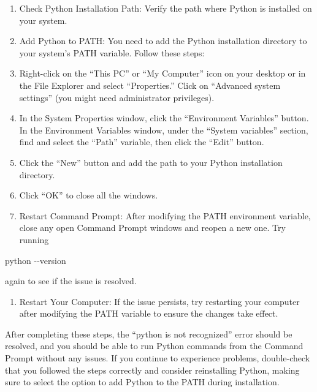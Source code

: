 \documentclass[
]{article}
\newenvironment{Shaded}{\begin{snugshade}}{\end{snugshade}}
\newcommand{\NormalTok}[1]{#1}
\providecommand{\tightlist}{%
  \setlength{\itemsep}{0pt}\setlength{\parskip}{0pt}}
\begin{document}
\begin{enumerate}
\def\labelenumi{\arabic{enumi}.}
\tightlist
\item
  Check Python Installation Path: Verify the path where Python is
  installed on your system.\\
\item
  Add Python to PATH: You need to add the Python installation directory
  to your system's PATH variable. Follow these steps:\\
\item
  Right-click on the ``This PC'' or ``My Computer'' icon on your desktop
  or in the File Explorer and select ``Properties.'' Click on ``Advanced
  system settings'' (you might need administrator privileges).\\
\item
  In the System Properties window, click the ``Environment Variables''
  button. In the Environment Variables window, under the ``System
  variables'' section, find and select the ``Path'' variable, then click
  the ``Edit'' button.\\
\item
  Click the ``New'' button and add the path to your Python installation
  directory.\\
\item
  Click ``OK'' to close all the windows.\\
\item
  Restart Command Prompt: After modifying the PATH environment variable,
  close any open Command Prompt windows and reopen a new one. Try
  running
\end{enumerate}

\begin{Shaded}
\begin{Highlighting}[]
\NormalTok{python {-}{-}version}
\end{Highlighting}
\end{Shaded}

again to see if the issue is resolved.\\

\begin{enumerate}
\def\labelenumi{\arabic{enumi}.}
\setcounter{enumi}{7}
\tightlist
\item
  Restart Your Computer: If the issue persists, try restarting your
  computer after modifying the PATH variable to ensure the changes take
  effect.
\end{enumerate}

After completing these steps, the ``python is not recognized'' error
should be resolved, and you should be able to run Python commands from
the Command Prompt without any issues. If you continue to experience
problems, double-check that you followed the steps correctly and
consider reinstalling Python, making sure to select the option to add
Python to the PATH during installation.
\end{document}
